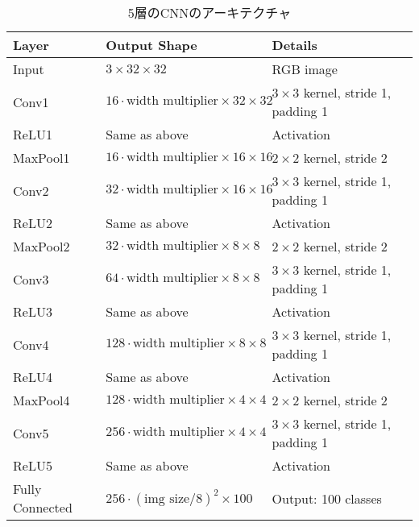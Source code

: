 \begin{table}[h]
    \centering
    \caption{5層のCNNのアーキテクチャ}
    \label{tab:cnn5layer}
    \begin{tabular}{lll}
    \toprule
    \textbf{Layer} & \textbf{Output Shape} & \textbf{Details} \\
    \midrule
    Input & $3 \times 32 \times 32$ & RGB image \\
    Conv1 & $16 \cdot \text{width multiplier} \times 32 \times 32$ & $3 \times 3$ kernel, stride 1, padding 1 \\
    ReLU1 & Same as above & Activation \\
    MaxPool1 & $16 \cdot \text{width multiplier} \times 16 \times 16$ & $2 \times 2$ kernel, stride 2 \\
    Conv2 & $32 \cdot \text{width multiplier} \times 16 \times 16$ & $3 \times 3$ kernel, stride 1, padding 1 \\
    ReLU2 & Same as above & Activation \\
    MaxPool2 & $32 \cdot \text{width multiplier} \times 8 \times 8$ & $2 \times 2$ kernel, stride 2 \\
    Conv3 & $64 \cdot \text{width multiplier} \times 8 \times 8$ & $3 \times 3$ kernel, stride 1, padding 1 \\
    ReLU3 & Same as above & Activation \\
    Conv4 & $128 \cdot \text{width multiplier} \times 8 \times 8$ & $3 \times 3$ kernel, stride 1, padding 1 \\
    ReLU4 & Same as above & Activation \\
    MaxPool4 & $128 \cdot \text{width multiplier} \times 4 \times 4$ & $2 \times 2$ kernel, stride 2 \\
    Conv5 & $256 \cdot \text{width multiplier} \times 4 \times 4$ & $3 \times 3$ kernel, stride 1, padding 1 \\
    ReLU5 & Same as above & Activation \\
    Fully Connected & $256 \cdot (\text{img size}/8)^2 \times 100$ & Output: 100 classes \\
    \bottomrule
    \end{tabular}
\end{table}

